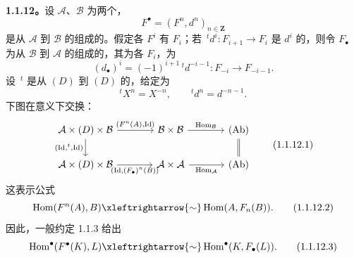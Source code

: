 \textbf{1.1.12。}设 $\mathcal A$、$\mathcal B$ 为两个，
\[
F^{\bullet}=(F^n,d^n)_{n\in\mathbf Z}
\]
是从 $\mathcal A$ 到 $\mathcal B$ 的组成的。假定各 $F^i$ 有 $F_i$；若 $\,{}^td^i:F_{i+1}\to F_i$ 是 $d^i$ 的，则令 $F_{\bullet}$ 为从 $\mathcal B$ 到 $\mathcal A$ 的组成的，其为各 $F_i$，为
\[
(d_{\bullet})^i=(-1)^{i+1}\,{}^td^{-i-1}:F_{-i}\longrightarrow F_{-i-1}.
\]
设 $\,{}^t$ 是从 $(D)$ 到 $(D)$ 的，给定为
\[
{}^tX^n=X^{-n},\qquad{}^td^n=d^{-n-1}.
\]
下图在意义下交换：
\[
\begin{tikzcd}[column sep=large]
\mathcal A\times(D)\times\mathcal B\arrow[r,"{(F^n(A),\operatorname{Id})}"]\arrow[d,"{(\operatorname{Id},{}^t,\operatorname{Id})}"']&\mathcal B\times\mathcal B\arrow[r,"\operatorname{Hom}_{\mathcal B}"]&(\mathrm{Ab})\arrow[d,equal]\\
\mathcal A\times(D)\times\mathcal B\arrow[r,"{(\operatorname{Id},(F_{\bullet})^n(B))}"']&\mathcal A\times\mathcal A\arrow[r,"\operatorname{Hom}_{\mathcal A}"']&(\mathrm{Ab})
\end{tikzcd}\tag{1.1.12.1}
\]
这表示公式
\[
\operatorname{Hom}(F^n(A),B)\xleftrightarrow{\sim}\operatorname{Hom}(A,F_n(B)).\tag{1.1.12.2}
\]
因此，一般约定 1.1.3 给出
\[
\operatorname{Hom}^{\bullet}(F^{\bullet}(K),L)\xleftrightarrow{\sim}\operatorname{Hom}^{\bullet}(K,F_{\bullet}(L)).\tag{1.1.12.3}
\]

